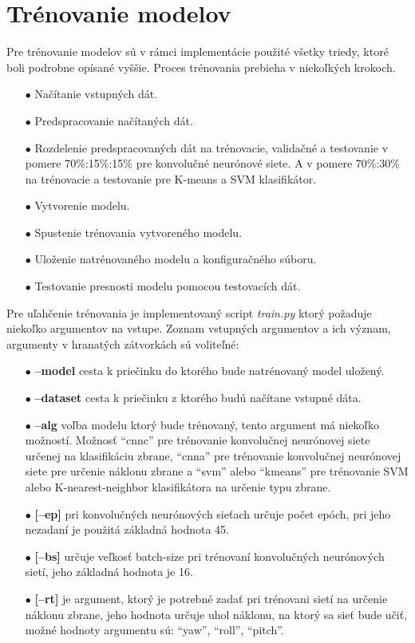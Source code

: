 
\section{Trénovanie modelov}
\label{sec:trenovanie}
Pre trénovanie modelov sú v rámci implementácie použité všetky triedy, ktoré boli podrobne opísané vyššie.
Proces trénovania prebieha v niekoľkých krokoch.
\begin{enumerate}
    \item[$\bullet$] Načítanie vstupných dát.
    \item[$\bullet$] Predspracovanie načítaných dát.
    \item[$\bullet$] Rozdelenie predspracovaných dát na trénovacie, validačné a testovanie v pomere 70\%:15\%:15\% pre konvolučné neurónové siete.
    A v pomere 70\%:30\% na trénovacie a testovanie pre K-means a SVM klasifikátor.
    \item[$\bullet$] Vytvorenie modelu.
    \item[$\bullet$] Spustenie trénovania vytvoreného modelu.
    \item[$\bullet$] Uloženie natrénovaného modelu a konfiguračného súboru.
    \item[$\bullet$] Testovanie presnosti modelu pomocou testovacích dát.
\end{enumerate}

Pre uľahčenie trénovania je implementovaný script \textit{train.py} ktorý požaduje niekoľko argumentov na vstupe.
Zoznam vstupných argumentov a ich význam, argumenty v hranatých zátvorkách sú voliteľné:
\begin{enumerate}
  \item[$\bullet$] \textbf{--model} cesta k priečinku do ktorého bude natrénovaný model uložený.
  \item[$\bullet$] \textbf{--dataset} cesta k priečinku z ktorého budú načítane vstupné dáta.
  \item[$\bullet$] \textbf{--alg} voľba modelu ktorý bude trénovaný, tento argument má niekoľko možností.
  Možnosť ``cnnc'' pre trénovanie konvolučnej neurónovej siete určenej na klasifikáciu zbrane,
  ``cnna'' pre trénovanie konvolučnej neurónovej siete pre určenie náklonu zbrane a
  ``svm'' alebo ``kmeans'' pre trénovanie SVM alebo K-nearest-neighbor klasifikátora na určenie typu zbrane.
  \item[$\bullet$] \textbf{[--ep]} pri konvolučných neurónových sieťach určuje počet epóch, pri jeho nezadaní je použitá
  základná hodnota 45.
  \item[$\bullet$] \textbf{[--bs]} určuje veľkosť batch-size pri trénovaní konvolučných neurónových sietí, jeho
  základná hodnota je 16.
  \item[$\bullet$] \textbf{[--rt]} je argument, ktorý je potrebné zadať pri trénovani sietí na určenie náklonu zbrane,
  jeho hodnota určuje uhol náklonu, na ktorý sa sieť bude učiť, možné hodnoty argumentu sú: ``yaw'', ``roll'', ``pitch''.
\end{enumerate}

